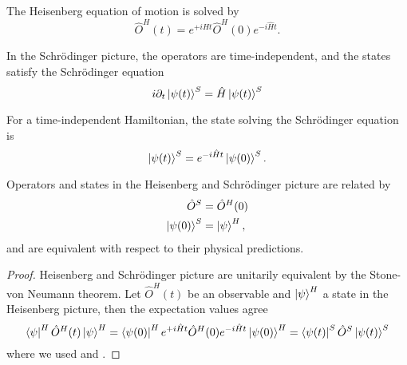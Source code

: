 \begin{lemma}\label{thm:heisenberg_eom_sol}
	The Heisenberg equation of motion is solved by
	\begin{equation}
		\hat{O}^H(t)
		=
		e^{+i\hat{H}t}
		\hat{O}^H(0)
		e^{-i\hat{H}t}
		.
	\end{equation}
\end{lemma}
\begin{definition}
	In the Schrödinger picture, the operators are time-independent, and the states satisfy the Schrödinger equation
	\begin{equation}
		i\partial_t
		\ket{\psi(t)}^S
		=
		\hat{H}
		\ket{\psi(t)}^S
	\end{equation}
\end{definition}
\begin{lemma}\label{thm:schroedinger_eom_sol}
	For a time-independent Hamiltonian, the state solving the Schrödinger equation is
	\begin{equation}
		\ket{\psi(t)}^S
		=
		e^{-i\hat{H}t}
		\ket{\psi(0)}^S
		.
	\end{equation}
\end{lemma}
\begin{theorem}\label{thm:heisenberg_schroedinger_equivalence}
	Operators and states in the Heisenberg and Schrödinger picture are related by
	\begin{align}
		\hat{O}^S
		&=
		\hat{O}^H(0)
		\\
		\ket{\psi(0)}^S
		&=
		\ket{\psi}^H
		,
	\end{align}
	and are equivalent with respect to their physical predictions.
\end{theorem}
\begin{proof}
	Heisenberg and Schrödinger picture are unitarily equivalent by the Stone-von Neumann theorem.
	Let $\hat{O}^H(t)$ be an observable and $\ket{\psi}^H$ a state in the Heisenberg picture, then the expectation values agree
	\begin{equation*}
		\bra{\psi}^H
		\hat{O}^H(t)
		\ket{\psi}^H
		=
		\bra{\psi(0)}^H
		e^{+i\hat{H}t}
		\hat{O}^H(0)
		e^{-i\hat{H}t}
		\ket{\psi(0)}^H
		=
		\bra{\psi(t)}^S
		\hat{O}^S
		\ket{\psi(t)}^S
	\end{equation*}
	where we used  and .
\end{proof}

